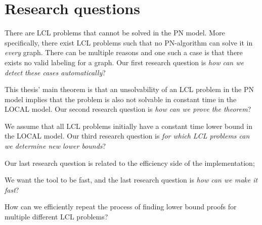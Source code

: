 
\section{Research questions} \label{sec:research_question}

There are LCL problems that cannot be solved in the PN model.
More specifically, there exist LCL problems such that no PN-algorithm can solve it in \emph{every} graph.
There can be multiple reasons and one such a case is that there exists no valid labeling for a graph.
Our first research question is \emph{how can we detect these cases automatically}?

This thesis' main theorem is that an unsolvability of an LCL problem in the PN model implies that the problem is also not solvable in constant time in the LOCAL model.
Our second research question is \emph{how can we prove the theorem}?

We assume that all LCL problems initially have a constant time lower bound in the LOCAL model.
Our third research question is \emph{for which LCL problems can we determine new lower bounds}?

Our last research question is related to the efficiency side of the implementation;

We want the tool to be fast, and the last research question is \emph{how can we make it fast}?

How can we efficiently repeat the process of finding lower bound proofs for multiple different LCL problems?

